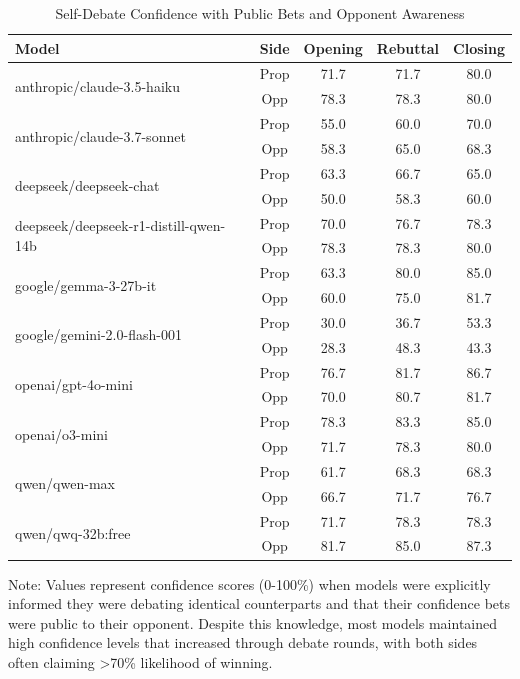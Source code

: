 \documentclass{article}
\begin{document}
\begin{table}[htbp]
  \centering
  \caption{Self-Debate Confidence with Public Bets and Opponent Awareness}
  \label{tab:self-debate-public}
  \begin{tabular}{l|c|ccc}
      \toprule
      \textbf{Model} & \textbf{Side} & \textbf{Opening} & \textbf{Rebuttal} & \textbf{Closing} \\
      \midrule
      \multirow{2}{*}{anthropic/claude-3.5-haiku} & Prop & 71.7 & 71.7 & 80.0 \\
       & Opp & 78.3 & 78.3 & 80.0 \\
      \midrule
      \multirow{2}{*}{anthropic/claude-3.7-sonnet} & Prop & 55.0 & 60.0 & 70.0 \\
       & Opp & 58.3 & 65.0 & 68.3 \\
      \midrule
      \multirow{2}{*}{deepseek/deepseek-chat} & Prop & 63.3 & 66.7 & 65.0 \\
       & Opp & 50.0 & 58.3 & 60.0 \\
      \midrule
      \multirow{2}{*}{deepseek/deepseek-r1-distill-qwen-14b} & Prop & 70.0 & 76.7 & 78.3 \\
       & Opp & 78.3 & 78.3 & 80.0 \\
      \midrule
      \multirow{2}{*}{google/gemma-3-27b-it} & Prop & 63.3 & 80.0 & 85.0 \\
       & Opp & 60.0 & 75.0 & 81.7 \\
      \midrule
      \multirow{2}{*}{google/gemini-2.0-flash-001} & Prop & 30.0 & 36.7 & 53.3 \\
       & Opp & 28.3 & 48.3 & 43.3 \\
      \midrule
      \multirow{2}{*}{openai/gpt-4o-mini} & Prop & 76.7 & 81.7 & 86.7 \\
       & Opp & 70.0 & 80.7 & 81.7 \\
      \midrule
      \multirow{2}{*}{openai/o3-mini} & Prop & 78.3 & 83.3 & 85.0 \\
       & Opp & 71.7 & 78.3 & 80.0 \\
      \midrule
      \multirow{2}{*}{qwen/qwen-max} & Prop & 61.7 & 68.3 & 68.3 \\
       & Opp & 66.7 & 71.7 & 76.7 \\
      \midrule
      \multirow{2}{*}{qwen/qwq-32b:free} & Prop & 71.7 & 78.3 & 78.3 \\
       & Opp & 81.7 & 85.0 & 87.3 \\
      \bottomrule
  \end{tabular}
  \begin{tablenotes}
    \small
    \item Note: Values represent confidence scores (0-100\%) when models were explicitly informed they were debating identical counterparts and that their confidence bets were public to their opponent. Despite this knowledge, most models maintained high confidence levels that increased through debate rounds, with both sides often claiming >70\% likelihood of winning.
  \end{tablenotes}
\end{table}
\end{document}
